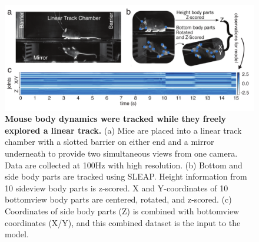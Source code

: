 \begin{figure}[t!]
  \begin{center}
    \includegraphics[width=0.90\linewidth]{ch3-slds/slds-figures/Fig1.pdf}
    \caption[Mouse body dynamics were tracked while they freely explored a linear track]{\textbf{Mouse body dynamics were tracked while they freely explored a linear track.} (a) Mice are placed into a linear track chamber with a slotted barrier on either end and a mirror underneath to provide two simultaneous views from one camera. Data are collected at 100Hz with high resolution. (b) Bottom and side body parts are tracked using SLEAP. Height information from 10 sideview body parts is z-scored. X and Y-coordinates of 10 bottomview body parts are centered, rotated, and z-scored. (c) Coordinates of side body parts (Z) is combined with bottomview coordinates (X/Y), and this combined dataset is the input to the model. }
    \label{fig:slds:1}
  \end{center}
\end{figure}